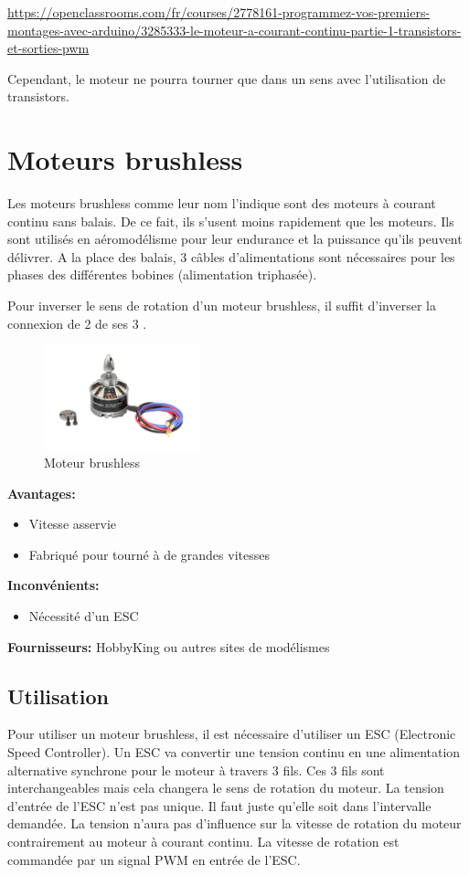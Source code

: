 \documentclass[a4paper, 11pt]{report}
\begin{document}
\url{https://openclassrooms.com/fr/courses/2778161-programmez-vos-premiers-montages-avec-arduino/3285333-le-moteur-a-courant-continu-partie-1-transistors-et-sorties-pwm}

Cependant, le moteur ne pourra tourner que dans un sens avec l'utilisation de transistors.

\section{Moteurs brushless}
Les moteurs brushless comme leur nom l'indique sont des moteurs à courant continu sans balais. De ce fait, ils s'usent moins rapidement que les moteurs. Ils sont  utilisés en aéromodélisme pour leur endurance et la puissance qu'ils peuvent délivrer. A la place des balais, 3 câbles d'alimentations sont nécessaires pour les phases des différentes bobines (alimentation triphasée).

Pour inverser le sens de rotation d'un moteur brushless, il suffit d'inverser la connexion de 2 de ses 3 .

\begin{figure}[h!]
\begin{centering}
\includegraphics[width=0.4\textwidth]{images/MoteurBrushless.jpg}
\caption{Moteur brushless}
\par\end{centering}
\end{figure}

\textbf{Avantages:}
\begin{itemize}
\item Vitesse asservie
\item Fabriqué pour tourné à de grandes vitesses
\end{itemize}

\textbf{Inconvénients:}
\begin{itemize}
\item Nécessité d'un ESC
\end{itemize}

\textbf{Fournisseurs:} HobbyKing ou autres sites de modélismes

\subsection{Utilisation}
Pour utiliser un moteur brushless, il est nécessaire d'utiliser un  ESC (Electronic Speed Controller). Un ESC va convertir une tension continu en une alimentation alternative synchrone pour le moteur à travers 3 fils. Ces 3 fils sont interchangeables mais cela changera le sens de rotation du moteur. La tension d'entrée de l'ESC n'est pas unique. Il faut juste qu'elle soit dans l'intervalle demandée. La tension n'aura pas d'influence sur la vitesse de rotation du moteur contrairement au moteur à courant continu. La vitesse de rotation est commandée par un signal PWM en entrée de l'ESC.
\end{document}
